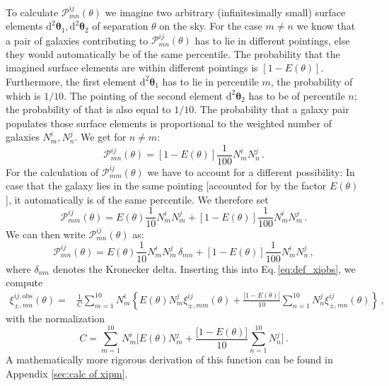 \documentclass[referee]{aa} %
\renewcommand{\[}{\begin{equation}}
\renewcommand{\]}{\end{equation}}
\renewcommand{\rm}{\mathrm}
\def\b#1{\bm{#1}}
\def\d{\rm{d}}
\begin{document}
To calculate $\mathcal{P}_{mn}^{ij}(\theta)$ we imagine two arbitrary (infinitesimally small) surface elements $\d^2\b\theta_1,\d^2\b\theta_2$ of separation $\theta$ on the sky. For the case $m\neq n$ we know that a pair of galaxies contributing to $\mathcal{P}_{mn}^{ij}(\theta)$ has to lie in different pointings, else they would automatically be of the same percentile. The probability that the imagined surface elements are within different pointings is $[1-E(\theta)]$. Furthermore, the first element $\d^2\b\theta_1$ has to lie in percentile $m$, the probability of which is $1/10$. The pointing of the second element $\d^2\b\theta_2$ has to be of percentile $n$; the probability of that is also equal to $1/10$. The probability that a galaxy pair populates those surface elements is proportional to the weighted number of galaxies $N_m^i,N_n^j$. We get for $n\neq m$: \[
\mathcal{P}_{mn}^{ij}(\theta) = [1-E(\theta)]\frac{1}{100} N_m^i N_n^j\, .
\label{eq:pmnij_corr1}
\]
For the calculation of $\mathcal{P}_{mm}^{ij}(\theta)$ we have to account for a different possibility: In case that the galaxy lies in the same pointing [accounted for by the factor $E(\theta)$], it automatically is of the same percentile. We therefore set \[
\mathcal{P}_{mm}^{ij}(\theta) = E(\theta)\frac{1}{10} N_m^iN_m^j + [1-E(\theta)]\frac{1}{100} N_m^i N_m^j \, .
\label{eq:pmnij_corr2}
\]
We can then write $\mathcal{P}_{mn}^{ij}(\theta)$ as: \[
\mathcal{P}_{mn}^{ij}(\theta) = E(\theta)\frac{1}{10} N_m^iN_m^j\,\delta_{mn} + [1-E(\theta)]\frac{1}{100} N_m^i N_n^j \, ,
\label{eq:pmnij_uncorr}
\]
where $\delta_{mn}$ denotes the Kronecker delta.
Inserting this into Eq.\,\eqref{eq:def_xiobs}, we compute
\begin{align}
\xi_{\pm,mn}^{ij,\rm{obs}}(\theta) = & \frac{1}{C}\sum_{m=1}^{10} N_m^i \left\{ E(\theta) N_m^j \xi_{\pm,mm}^{ij}(\theta) + \frac{\big[1-E(\theta)\big]}{10}\sum_{n=1}^{10}N_n^j \xi_{\pm,mn}^{ij}(\theta)\right\}\, ,
\label{eq:correctionfunction1}
\end{align}
with the normalization
\[
C = \sum_{m=1}^{10} N_m^i \bigg[ E(\theta)  N_m^j + \frac{\big[1-E(\theta)\big]}{10}\sum_{n=1}^{10} N_n^j\bigg]\, .
\]
A mathematically more rigorous derivation of this function can be found in Appendix \ref{sec:calc of xipm}.
\end{document}

